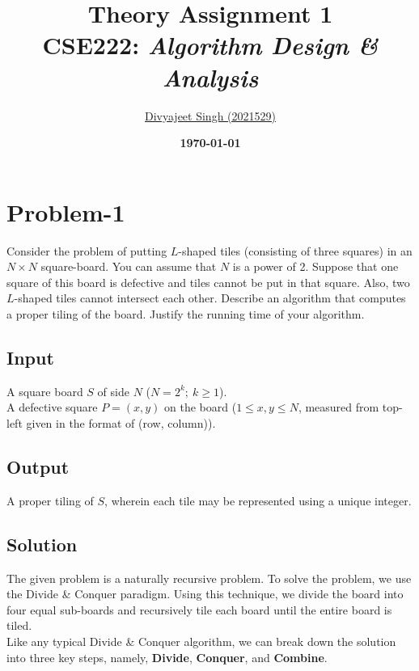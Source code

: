 \documentclass[12pt]{report}
\title{
    \textbf{\Huge{Theory Assignment 1}} \\
    \vspace*{15pt}
    \large{CSE222: \textit{Algorithm Design \& Analysis}}
}
\author{
    \href{mailto:divyajeet21529@iiitd.ac.in}{Divyajeet Singh (2021529)}
}
\date{
    \vspace*{10pt}
    \textbf{\today}
}
\begin{document}
    \maketitle

    \section*{\huge{Problem-1}}
    Consider the problem of putting $L$-shaped tiles (consisting of three squares) in an $N \times N$ square-board.
    You can assume that $N$ is a power of 2.
    Suppose that one square of this board is defective and tiles cannot be put in that square.
    Also, two $L$-shaped tiles cannot intersect each other.
    Describe an algorithm that computes a proper tiling of the board.
    Justify the running time of your algorithm.

    \subsection*{Input}
    A square board $S$ of side $N$ ($N = 2^{k}; \ k \ge 1$). \\
    A defective square $P = (x, y)$ on the board ($1 \le x, y \le N$, measured from top-left given in the format of (row, column)).

    \subsection*{Output}
    A proper tiling of $S$, wherein each tile may be represented using a
    unique integer.

    \subsection*{Solution}
    The given problem is a naturally recursive problem.
    To solve the problem, we use the Divide \& Conquer paradigm.
    Using this technique, we divide the board into four equal sub-boards and recursively
    tile each board until the entire board is tiled.
    \vspace*{10pt} \\
    Like any typical Divide \& Conquer algorithm, we can break down the solution into three key steps,
    namely, \textbf{Divide}, \textbf{Conquer}, and \textbf{Combine}.
\end{document}
